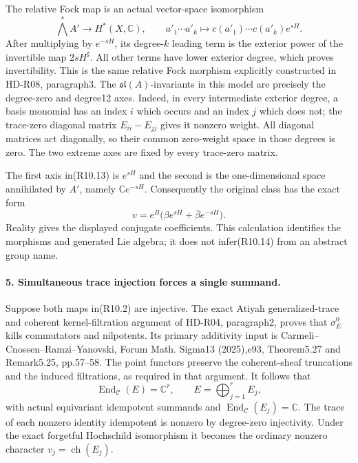 The relative Fock map is an actual vector-space isomorphism
\[
 \bigwedge^*A'\longrightarrow H^*(X,\mathbb C),\qquad
 a'_1\cdots a'_k\longmapsto
       c(a'_1)\cdots c(a'_k)e^{sH}.                         \tag{R10.13}
\]
After multiplying by $e^{-sH}$, its degree-$k$ leading term is
the exterior power of the invertible map $2sH^\sharp$.
All other terms have lower exterior degree, which proves
invertibility. This is the same relative Fock morphism
explicitly constructed in HD-R08, paragraph3.
The $\mathfrak{sl}(A)$-invariants in this model are precisely
the degree-zero and degree12 axes. Indeed, in every intermediate
exterior degree, a basis monomial has an index $i$ which occurs
and an index $j$ which does not; the trace-zero diagonal matrix
$E_{ii}-E_{jj}$ gives it nonzero weight. All diagonal matrices
act diagonally, so their common zero-weight space in those
degrees is zero. The two extreme axes are fixed by every
trace-zero matrix.

The first axis in(R10.13) is $e^{sH}$ and the second is the
one-dimensional space annihilated by $A'$, namely
$\mathbb C e^{-sH}$. Consequently the original class has
the exact form
\[
            v=e^B\bigl(\beta e^{sH}+\bar\beta e^{-sH}\bigr).
                                                               \tag{R10.14}
\]
Reality gives the displayed conjugate coefficients. This
calculation identifies the morphisms and generated Lie algebra;
it does not infer(R10.14) from an abstract group name.

\paragraph{5. Simultaneous trace injection forces a single summand.}
Suppose both maps in(R10.2) are injective. The exact
Atiyah generalized-trace and coherent kernel-filtration
argument of HD-R04, paragraph2, proves that $\sigma_E^0$
kills commutators and nilpotents. Its primary additivity input
is Carmeli--Cnossen--Ramzi--Yanovski, Forum Math. Sigma13
(2025),e93, Theorem5.27 and Remark5.25, pp.57--58.
The point functors preserve the coherent-sheaf truncations
and the induced filtrations, as required in that argument.
It follows that
\[
 \operatorname{End}_{\mathcal C}(E)=\mathbb C^r,\qquad
                      E=\bigoplus_{j=1}^r E_j,              \tag{R10.15}
\]
with actual equivariant idempotent summands and
$\operatorname{End}_{\mathcal C}(E_j)=\mathbb C$.
The trace of each nonzero identity idempotent is nonzero by
degree-zero injectivity. Under the exact forgetful Hochschild
isomorphism it becomes the ordinary nonzero character
$v_j=\operatorname{ch}(E_j)$.

